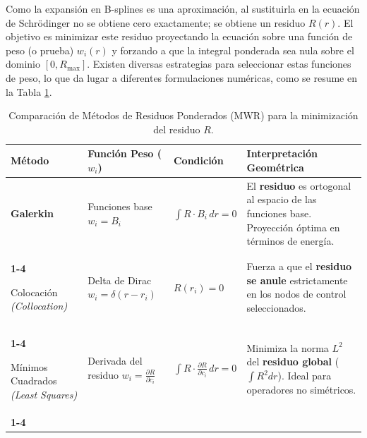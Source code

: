 Como la expansión en B-splines es una aproximación, al sustituirla en la ecuación de Schrödinger no se obtiene cero exactamente; se obtiene un residuo \( R(r) \). El objetivo es minimizar este residuo proyectando la ecuación sobre una función de peso (o prueba) \( w_i(r) \) y forzando a que la integral ponderada sea nula sobre el dominio \( [0,R_{\text{max}}] \). Existen diversas estrategias para seleccionar estas funciones de peso, lo que da lugar a diferentes formulaciones numéricas, como se resume en la Tabla \cref{tab:mwr-methods}.

\begin{table}[htbp]
    \centering
    \caption{Comparación de Métodos de Residuos Ponderados (MWR) para la minimización del residuo $R$.}
    \label{tab:mwr-methods}
    \renewcommand{\arraystretch}{2.0} %
    \setlength{\tabcolsep}{8pt}       %
    
    \begin{tabularx}{\textwidth}{ 
        >{\RaggedRight\bfseries}m{2.5cm}  
        >{\RaggedRight}m{3.5cm}           
        >{\centering}m{3.5cm}             
        >{\RaggedRight\arraybackslash}X   
    }
        \toprule
        Método & Función Peso ($w_i$) & Condición & Interpretación \newline Geométrica \\
        \midrule
        
        Galerkin & 
        Funciones base \newline $w_i = B_i$ & 
        $\displaystyle \int R \cdot B_i \, dr = 0$ & 
        El \textbf{residuo} es ortogonal al espacio de las funciones base. Proyección óptima en términos de energía. \\
        \cmidrule{1-4}
        
        Colocación \newline \textit{\footnotesize (Collocation)} & 
        Delta de Dirac \newline $w_i = \delta(r - r_i)$ & 
        $R(r_i) = 0$ & 
        Fuerza a que el \textbf{residuo se anule} estrictamente en los nodos de control seleccionados. \\
        \cmidrule{1-4}
        
        Mínimos Cuadrados \newline \textit{\footnotesize (Least \newline Squares)} & 
        Derivada del \newline residuo \newline $w_i = \frac{\partial R}{\partial c_i}$ & 
        $\displaystyle \int R \cdot \frac{\partial R}{\partial c_i} \, dr = 0$ & 
        Minimiza la norma $L^2$ del \textbf{residuo global} ($\int R^2 dr$). Ideal para operadores no simétricos. \\
        \cmidrule{1-4}
        

\end{tabularx}
\end{table}
